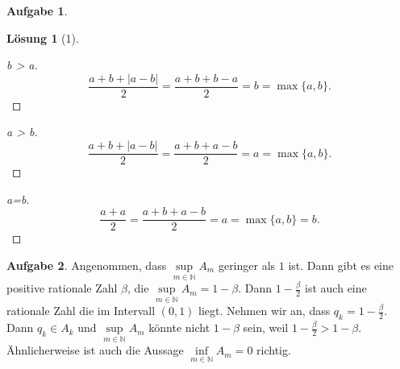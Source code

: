 \documentclass{article}
\theoremstyle{definition}
\newtheorem{ub}{Aufgabe}
\newtheorem*{lo*}{Lösung}
\begin{document}
\begin{ub}
	\begin{lo*}[1]
		\begin{proof}[b > a]
			\[ 
			\frac{a+b+|a-b|}{2} = \frac{a+b + b -a}{2} = b = \max\{a,b\}.
			 \]
		\end{proof}
		\begin{proof}[a > b]
			\[ 
			\frac{a+b+|a-b|}{2} = \frac{a+b + a -b}{2} = a = \max\{a,b\}.
			 \]
		\end{proof}
		\begin{proof}[a=b]
			\[ 
			\frac{a+a}{2} = \frac{a+b + a -b}{2} = a = \max\{a,b\} = b.
			\]
		\end{proof}
	\end{lo*}
\end{ub}
\begin{ub}
	Angenommen, dass $ \sup\limits_{m \in \mathbb{N}}A_m $ geringer als $ 1 $ ist. Dann gibt es eine positive rationale Zahl $ \beta $, die $ \sup\limits_{m \in \mathbb{N}}A_m = 1 - \beta $. Dann $ 1 - \frac{\beta}{2} $ ist auch eine rationale Zahl die im Intervall $ (0,1) $ liegt. Nehmen wir an, dass
	$ q_k = 1 - \frac{\beta}{2} $. Dann $ q_k \in A_k $ und $ \sup\limits_{m \in \mathbb{N}}A_m $ könnte nicht $ 1 - \beta $ sein, weil $ 1-\frac{\beta}{2} > 1- \beta $. Ähnlicherweise ist auch die Aussage $ \inf\limits_{m \in \mathbb{N}}A_m = 0 $ richtig.
\end{ub}
\end{document}
